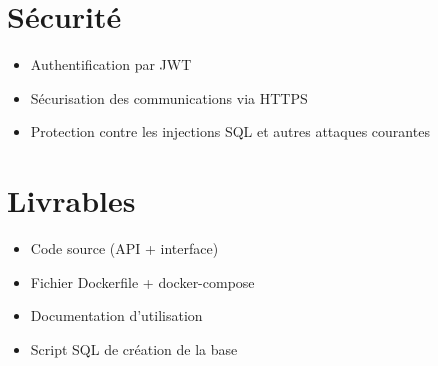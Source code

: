 \documentclass[12pt,a4paper]{article}
\begin{document}
\section{Sécurité}
\begin{itemize}
    \item Authentification par JWT
    \item Sécurisation des communications via HTTPS
    \item Protection contre les injections SQL et autres attaques courantes
\end{itemize}

\section{Livrables}
\begin{itemize}
    \item Code source (API + interface)
    \item Fichier Dockerfile + docker-compose
    \item Documentation d’utilisation
    \item Script SQL de création de la base
\end{itemize}
\end{document}
